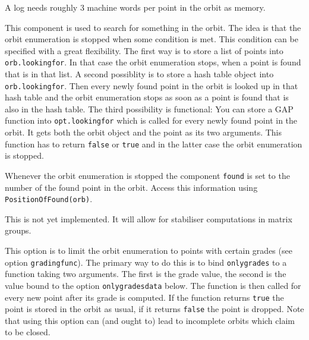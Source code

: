 \documentclass[a4paper,11pt]{report}
\begin{document}
{{{\begin{description}
 A log needs roughly 3 machine words per point in the orbit as memory. 
\item[{\texttt{lookingfor}}] This component is used to search for something in the orbit. The idea is that
the orbit enumeration is stopped when some condition is met. This condition
can be specified with a great flexibility. The first way is to store a list of
points into \texttt{orb.lookingfor}. In that case the orbit enumeration stops, when a point is found that is in
that list. A second possiblity is to store a hash table object into \texttt{orb.lookingfor}. Then every newly found point in the orbit is looked up in that hash table
and the orbit enumeration stops as soon as a point is found that is also in
the hash table. The third possibility is functional: You can store a \textsf{GAP} function into \texttt{opt.lookingfor} which is called for every newly found point in the orbit. It gets both the
orbit object and the point as its two arguments. This function has to return \texttt{false} or \texttt{true} and in the latter case the orbit enumeration is stopped. 

 Whenever the orbit enumeration is stopped the component \texttt{found} is set to the number of the found point in the orbit. Access this information
using \texttt{PositionOfFound(orb)}. 
\item[{\texttt{matgens}}] This is not yet implemented. It will allow for stabiliser computations in
matrix groups.
\item[{\texttt{onlygrades}}] This option is to limit the orbit enumeration to points with certain grades
(see option \texttt{gradingfunc}). The primary way to do this is to bind \texttt{onlygrades} to a function taking two arguments. The first is the grade value, the second
is the value bound to the option \texttt{onlygradesdata} below. The function is then called for every new point after its grade is
computed. If the function returns \texttt{true} the point is stored in the orbit as usual, if it returns \texttt{false} the point is dropped. Note that using this option can (and ought to) lead to
incomplete orbits which claim to be closed. 


\end{description}}}}
\end{document}
